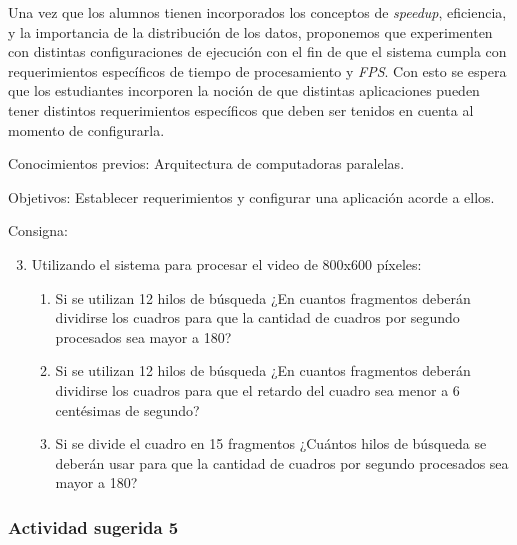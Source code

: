Una vez que los alumnos tienen incorporados los conceptos de \emph{speedup},
eficiencia, y la importancia de la distribución de los datos, proponemos que
experimenten con distintas configuraciones de ejecución con el fin de que el
sistema cumpla con requerimientos específicos de tiempo de procesamiento y
\emph{FPS}. Con esto se espera que los estudiantes incorporen la noción de que
distintas aplicaciones pueden tener distintos requerimientos específicos que
deben ser tenidos en cuenta al momento de configurarla.

\begin{description}

	\item{Conocimientos previos}: Arquitectura de computadoras paralelas.

	\item{Objetivos}: Establecer requerimientos y configurar una aplicación
		acorde a ellos.

	\item{Consigna}: \begin{enumerate}

	\setcounter{enumi}{2}

	\item{Utilizando el sistema para procesar el video de 800x600 píxeles:

\begin{enumerate}

	\item{Si se utilizan 12 hilos de búsqueda ¿En cuantos fragmentos deberán
		dividirse los cuadros para que la cantidad de cuadros por
		segundo procesados sea mayor a 180?}

	\item{Si se utilizan 12 hilos de búsqueda ¿En cuantos fragmentos deberán
		dividirse los cuadros para que el retardo del cuadro sea menor a
		6 centésimas de segundo?}

	\item{Si se divide el cuadro en 15 fragmentos ¿Cuántos hilos de búsqueda
		se deberán usar para que la cantidad de cuadros por segundo
		procesados sea mayor a 180?}

\end{enumerate}}

\end{enumerate}

\end{description}

\subsubsection{Actividad sugerida 5}

